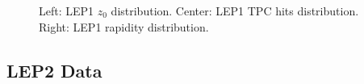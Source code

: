 \begin{figure}[H]
\centering
{}\hfill
{}\hfill %
\hfill %
\caption{Left: LEP1 $z_0$ distribution. Center: LEP1 TPC hits distribution. Right: LEP1 rapidity distribution.}
\end{figure}


\subsection{LEP2 Data}


